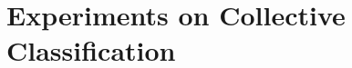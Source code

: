 \documentclass{beamer}
\begin{document}
%	 
%
%
%

\section{Experiments on Collective Classification}
\end{document}
